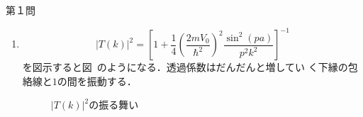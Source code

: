 \documentclass[fleqn]{jbook}
\numberwithin{equation}{section}
\numberwithin{figure}{section}
\numberwithin{table}{section}
\begin{document}
\begin{answer}{第１問}{}
\begin{enumerate}
定在波が生じる条件は
\begin{equation}
 a=\frac{1}{2}\cdot\frac{2\pi}{p}\times n\,\,\,\,(n \in \textbf{Z}_{>0}) \eqname{eq:25}
\end{equation}
と現されるが,これは確かに式~()に等しい．
\item
\[
 |T(k)|^2=\left[ 1+ \frac{1}{4}\left(\frac{2mV_0}{\hbar^2}\right)^2 \frac{\sin^2(pa)}{p^2k^2}\right]^{-1}
\]
を図示すると図~のようになる．透過係数はだんだんと増してい
く下縁の包絡線と$1$の間を振動する．
\begin{figure}[htbp]
 \begin{center}
 \end{center}
\caption{$|T(k)|^2$の振る舞い}
\end{figure}
\end{enumerate}
\end{answer}
\end{document}
